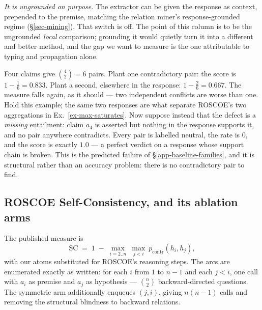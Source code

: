 \emph{It is ungrounded on purpose.} The extractor can be given the response as context, prepended to
the premise, matching the relation miner's response-grounded regime (\S\ref{sec-mining}). That switch
is off. The point of this column is to be the ungrounded \emph{local} comparison; grounding it would
quietly turn it into a different and better method, and the gap we want to measure is the one
attributable to typing and propagation alone.

\begin{example}
\label{ex-rate-accumulates}
Four claims give $\binom{4}{2}=6$ pairs. Plant one contradictory pair: the score is
$1-\tfrac{1}{6}=0.833$. Plant a second, elsewhere in the response: $1-\tfrac{2}{6}=0.667$. The measure
falls again, as it should --- two independent conflicts are worse than one. Hold this example; the same
two responses are what separate ROSCOE's two aggregations in Ex.~\ref{ex-max-saturates}. Now suppose
instead that the defect is a \emph{missing} entailment: claim $a_4$ is asserted but nothing in the
response supports it, and no pair anywhere contradicts. Every pair is labelled neutral, the rate is
$0$, and the score is exactly $1.0$ --- a perfect verdict on a response whose support chain is broken.
This is the predicted failure of \S\ref{app-baseline-families}, and it is structural rather than an
accuracy problem: there is no contradictory pair to find.
\end{example}


\subsection{ROSCOE Self-Consistency, and its ablation arms}
\label{app-baseline-roscoe}

The published measure is
\begin{equation}
\mathrm{SC} \;=\; 1 \;-\; \max_{i=2..n}\ \max_{j<i}\ p_{\mathrm{contr}}(h_i, h_j),
\label{eq-roscoe-sc}
\end{equation}
with our atoms substituted for ROSCOE's reasoning steps. The arcs are enumerated exactly as written:
for each $i$ from $1$ to $n-1$ and each $j<i$, one call with $a_i$ as premise and $a_j$ as
hypothesis --- $\binom{n}{2}$ backward-directed questions. The symmetric arm additionally enqueues
$(j,i)$, giving $n(n-1)$ calls and removing the structural blindness to backward relations.

